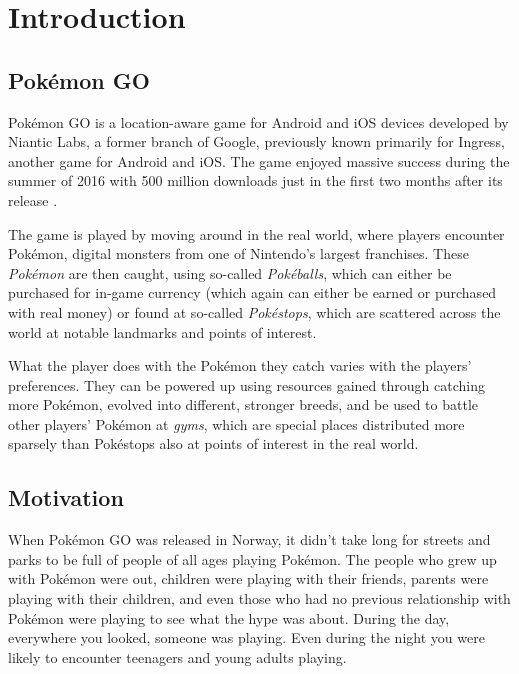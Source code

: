 
\chapter{Introduction}

\label{Chapter1}

\section{Pokémon GO}
\label{sec:about-pokemon-go}

Pokémon GO is a location-aware game for Android and iOS devices developed by Niantic Labs, a former branch of Google, previously known primarily for Ingress, another game for Android and iOS. The game enjoyed massive success during the summer of 2016 with 500 million downloads just in the first two months after its release .

The game is played by moving around in the real world, where players encounter Pokémon, digital monsters from one of Nintendo's largest franchises. These \emph{Pokémon} are then caught, using so-called \emph{Pokéballs}, which can either be purchased for in-game currency (which again can either be earned or purchased with real money) or found at so-called \emph{Pokéstops}, which are scattered across the world at notable landmarks and points of interest.

What the player does with the Pokémon they catch varies with the players' preferences. They can be powered up using resources gained through catching more Pokémon, evolved into different, stronger breeds, and be used to battle other players' Pokémon at \emph{gyms}, which are special places distributed more sparsely than Pokéstops also at points of interest in the real world.

\section{Motivation}

When Pokémon GO was released in Norway, it didn't take long for streets and parks to be full of people of all ages playing Pokémon. The people who grew up with Pokémon were out, children were playing with their friends, parents were playing with their children, and even those who had no previous relationship with Pokémon were playing to see what the hype was about. During the day, everywhere you looked, someone was playing. Even during the night you were likely to encounter teenagers and young adults playing.


